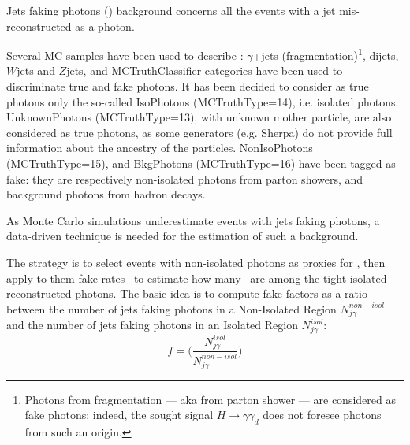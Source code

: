 
Jets faking photons (\jfakey) background concerns all the events with a jet mis-reconstructed as a photon.

Several MC samples have been used to describe \jfakey: $\gamma$+jets (fragmentation)\footnote{
Photons from fragmentation --- aka from parton shower --- are considered as fake photons: indeed, the sought signal $H\to\gamma\gamma_d$ does not foresee photons from such an origin.
}, dijets, $W$jets and $Z$jets, and
MCTruthClassifier categories have been used to discriminate true and fake photons. It has been decided to consider as true photons only the so-called IsoPhotons (MCTruthType=14), i.e. isolated photons. UnknownPhotons (MCTruthType=13), with unknown mother particle, are also considered as true photons, as some generators (e.g. Sherpa) do not provide full information about the ancestry of the particles. NonIsoPhotons (MCTruthType=15), and BkgPhotons (MCTruthType=16) have been tagged as fake: they are respectively non-isolated photons from parton showers, and background photons from hadron decays.


As Monte Carlo simulations underestimate events with jets faking photons, a data-driven technique is needed for the estimation of such a background. 

The strategy is to select events with non-isolated photons as proxies for \jfakey, then apply to them fake rates \fjy\ to estimate how many \jfakey\ are among the tight isolated reconstructed photons.
The basic idea is to compute fake factors as a ratio between the number of jets faking photons in a Non-Isolated Region $N_{j\gamma}^{non-isol}$ and the number of jets faking photons in an Isolated Region $N_{j\gamma}^{isol}$: 
\begin{equation}
  f = \Bigg(\frac{N_{j\gamma}^{isol}}{N_{j\gamma}^{non-isol}}\Bigg)
  \label{eq: ff}
\end{equation}

